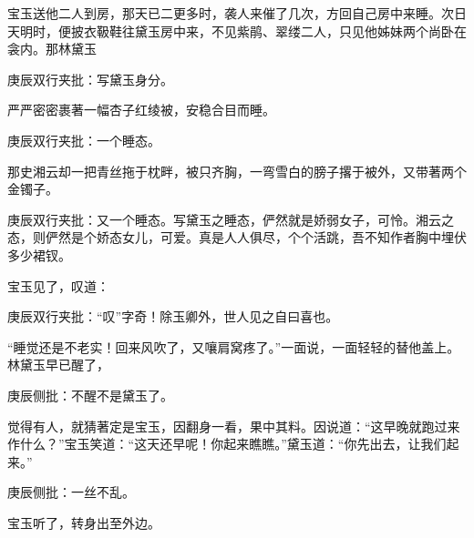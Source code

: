\begin{parag}


    宝玉送他二人到房，那天已二更多时，袭人来催了几次，方回自己房中来睡。次日天明时，便披衣靸鞋往黛玉房中来，不见紫鹃、翠缕二人，只见他姊妹两个尚卧在衾内。那林黛玉\begin{note}庚辰双行夹批：写黛玉身分。\end{note}严严密密裹著一幅杏子红绫被，安稳合目而睡。\begin{note}庚辰双行夹批：一个睡态。\end{note}那史湘云却一把青丝拖于枕畔，被只齐胸，一弯雪白的膀子撂于被外，又带著两个金镯子。\begin{note}庚辰双行夹批：又一个睡态。写黛玉之睡态，俨然就是娇弱女子，可怜。湘云之态，则俨然是个娇态女儿，可爱。真是人人俱尽，个个活跳，吾不知作者胸中埋伏多少裙钗。\end{note}宝玉见了，叹道：\begin{note}庚辰双行夹批：“叹”字奇！除玉卿外，世人见之自曰喜也。\end{note}“睡觉还是不老实！回来风吹了，又嚷肩窝疼了。”一面说，一面轻轻的替他盖上。林黛玉早已醒了，\begin{note}庚辰侧批：不醒不是黛玉了。\end{note}觉得有人，就猜著定是宝玉，因翻身一看，果中其料。因说道：“这早晚就跑过来作什么？”宝玉笑道：“这天还早呢！你起来瞧瞧。”黛玉道：“你先出去，让我们起来。”\begin{note}庚辰侧批：一丝不乱。\end{note}宝玉听了，转身出至外边。
\end{parag}



